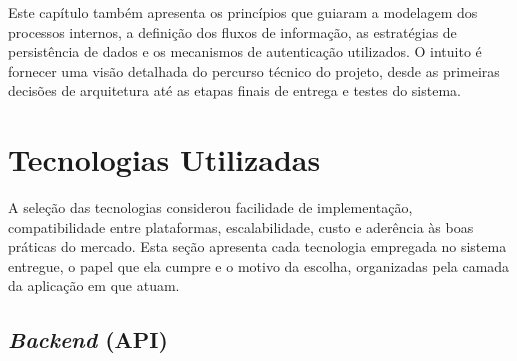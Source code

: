 Este capítulo também apresenta os princípios que guiaram a modelagem dos processos internos, a definição dos fluxos de informação, as estratégias de persistência de dados e os mecanismos de autenticação utilizados. O intuito é fornecer uma visão detalhada do percurso técnico do projeto, desde as primeiras decisões de arquitetura até as etapas finais de entrega e testes do sistema.

\section{Tecnologias Utilizadas}
\label{sec:tecnologias}
A seleção das tecnologias considerou facilidade de implementação, compatibilidade entre plataformas, escalabilidade, custo e aderência às boas práticas do mercado. Esta seção apresenta cada tecnologia empregada no sistema entregue, o papel que ela cumpre e o motivo da escolha, organizadas pela camada da aplicação em que atuam.

\subsection{\textit{Backend} (API)}

